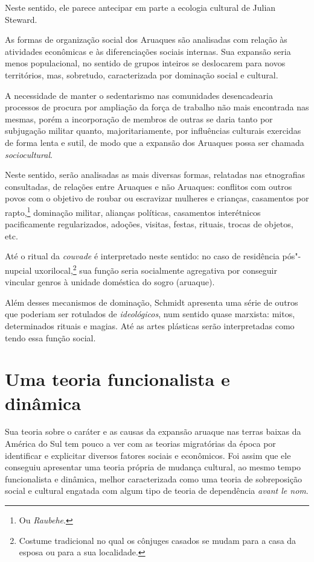 Neste sentido, ele parece antecipar em parte a
ecologia cultural de Julian Steward.

As formas de organização social dos Aruaques são analisadas com relação às atividades econômicas e às diferenciações sociais internas. Sua expansão seria menos populacional, no sentido de grupos inteiros se deslocarem para novos territórios, mas, sobretudo, caracterizada por dominação social e cultural. 

A necessidade de manter o sedentarismo nas comunidades desencadearia processos de procura por ampliação da força de trabalho não mais encontrada nas mesmas, porém a incorporação de membros de outras se daria tanto por subjugação militar quanto, majoritariamente, por influências culturais exercidas de forma lenta e sutil, de modo que a expansão dos Aruaques possa ser chamada \textit{sociocultural}. 

Neste sentido, serão analisadas as mais diversas formas, relatadas nas etnografias consultadas, de relações entre Aruaques e não Aruaques: conflitos com outros povos com o objetivo de roubar ou escravizar mulheres e crianças, casamentos por rapto,\footnote{Ou \textit{Raubehe}.} dominação militar, alianças políticas, casamentos interétnicos pacificamente regularizados, adoções, visitas, festas, rituais, trocas de objetos, etc. 

Até o ritual da \textit{couvade} é interpretado neste sentido: no caso de residência pós"-nupcial uxorilocal,\footnote{Costume tradicional no qual os cônjuges casados se mudam para a casa da esposa ou para a sua localidade.} sua função seria socialmente agregativa por conseguir vincular genros à unidade doméstica do sogro (aruaque).

Além desses mecanismos de dominação, Schmidt apresenta uma série de outros que poderiam ser rotulados de \textit{ideológicos}, num sentido quase marxista: mitos, determinados rituais e magias. Até as artes plásticas serão interpretadas como tendo essa função social.

\section{Uma teoria funcionalista e dinâmica}

Sua teoria sobre o caráter e as causas da expansão aruaque nas terras baixas da América do Sul tem pouco a ver com as teorias migratórias da época por identificar e explicitar diversos fatores sociais e econômicos. Foi assim que ele conseguiu apresentar uma teoria própria de mudança cultural, ao mesmo tempo funcionalista e dinâmica, melhor caracterizada como uma teoria de sobreposição social e cultural engatada com algum tipo de teoria de dependência \textit{avant le nom}. 


